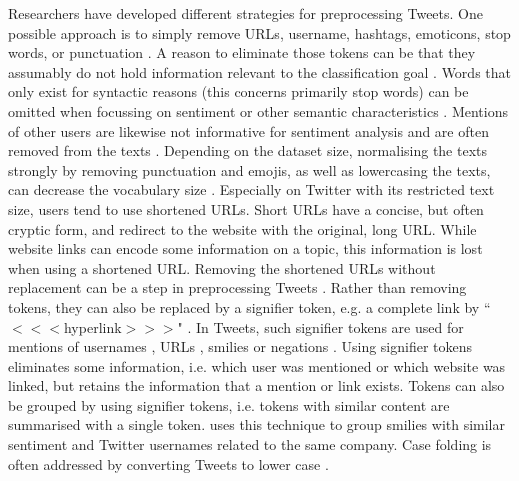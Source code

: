 Researchers have developed different strategies for preprocessing Tweets. One possible approach is to simply remove URLs, username, hashtags, emoticons, stop words, or punctuation \cite{xiang2012detecting} \cite{ghorai2016information} \cite{hemalatha2012preprocessing} \cite{montani2018tuwienkbs} \cite{gupta2018proposed} \cite{watanabe2018hate}. A reason to eliminate those tokens can be that they assumably do not hold information relevant to the classification goal \cite{hemalatha2012preprocessing}. Words that only exist for syntactic reasons (this concerns primarily stop words) can be omitted when focussing on sentiment or other semantic characteristics \cite{ghorai2016information}. Mentions of other users are likewise not informative for sentiment analysis and are often removed from the texts \cite{xiang2012detecting} \cite{watanabe2018hate}. Depending on the dataset size, normalising the texts strongly by removing punctuation and emojis, as well as lowercasing the texts, can decrease the vocabulary size \cite{ghorai2016information}. Especially on Twitter with its restricted text size, users tend to use shortened URLs. Short URLs have a concise, but often cryptic form, and redirect to the website with the original, long URL. While website links can encode some information on a topic, this information is lost when using a shortened URL. Removing the shortened URLs without replacement can be a step in preprocessing Tweets \cite{xiang2012detecting}.\newline
Rather than removing tokens, they can also be replaced by a signifier token, e.g. a complete link by ``$<<<$hyperlink$>>>$" \cite{hovelmann2017fasttext}. In Tweets, such signifier tokens are used for mentions of usernames \cite{smailovic2013predictive} \cite{hovelmann2017fasttext} \cite{rother2018ulmfit}, URLs \cite{smailovic2013predictive} \cite{hovelmann2017fasttext} \cite{rother2018ulmfit}, smilies \cite{hovelmann2017fasttext} or negations \cite{smailovic2013predictive}. Using signifier tokens eliminates some information, i.e. which user was mentioned or which website was linked, but retains the information that a mention or link exists. Tokens can also be grouped by using signifier tokens, i.e. tokens with similar content are summarised with a single token. \cite{hovelmann2017fasttext} uses this technique to group smilies with similar sentiment and Twitter usernames related to the same company.\newline 
Case folding is often addressed by converting Tweets to lower case \cite{ghorai2016information} \cite{hovelmann2017fasttext} \cite{gupta2018proposed}.\newline

